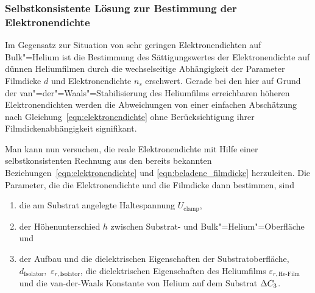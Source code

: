 \subsubsection{Selbstkonsistente Lösung zur Bestimmung der Elektronendichte}

Im Gegensatz zur Situation von sehr geringen Elektronendichten auf Bulk"=Helium ist die Bestimmung des Sättigungswertes der Elektronendichte auf dünnen Heliumfilmen durch die wechselseitige Abhängigkeit der Parameter Filmdicke $d$ und Elektronendichte $n_s$ erschwert. Gerade bei den hier auf Grund der van"=der"=Waals"=Stabilisierung des Heliumfilms erreichbaren höheren Elektronendichten werden die Abweichungen von einer einfachen Abschätzung nach Gleichung~\eqref{eqn:elektronendichte} ohne Berücksichtigung ihrer Filmdickenabhängigkeit signifikant.

Man kann nun versuchen, die reale Elektronendichte mit Hilfe einer selbstkonsistenten Rechnung aus den bereits bekannten Beziehungen~\eqref{eqn:elektronendichte} und \eqref{eqn:beladene_filmdicke} herzuleiten. Die Parameter, die die Elektronendichte und die Filmdicke dann bestimmen, sind
\begin{enumerate}
    \item die am Substrat angelegte Haltespannung $U_\text{clamp}$,
    \item der Höhenunterschied $h$ zwischen Substrat- und Bulk"=Helium"=Oberfläche und
    \item der Aufbau und die dielektrischen Eigenschaften der Substratoberfläche, $d_\text{Isolator},$ $\varepsilon_{r,\text{Isolator}}$, die dielektrischen Eigenschaften des Heliumfilms $\varepsilon_{r,\text{He-Film}}$ und die van-der-Waals Konstante von Helium auf dem Substrat $\Delta C_3$. 
\end{enumerate}

